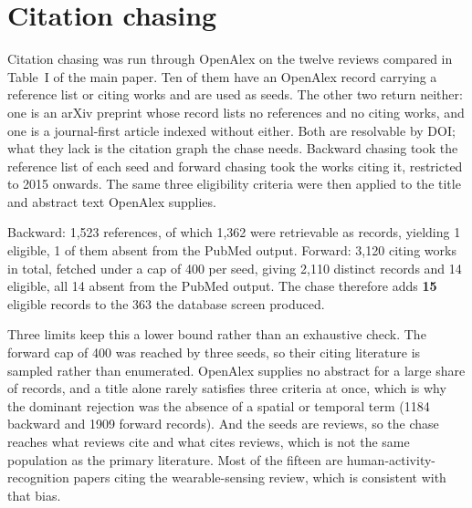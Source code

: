 \documentclass[journal]{IEEEtran}
\begin{document}
\section{Citation chasing}
\label{sec:chasing}
Citation chasing was run through OpenAlex on the twelve reviews compared in Table~I
of the main paper. Ten of them have an OpenAlex record carrying a reference list or
citing works and are used as seeds. The other two return neither: one is an arXiv
preprint whose record lists no references and no citing works, and one is a
journal-first article indexed without either. Both are resolvable by DOI; what they
lack is the citation graph the chase needs. Backward chasing took the reference list of each
seed and forward chasing took the works citing it, restricted to 2015 onwards.
The same three eligibility criteria were then applied to the title and abstract
text OpenAlex supplies.

Backward: 1{,}523 references, of which 1{,}362 were retrievable as records,
yielding 1 eligible, 1 of them absent from the PubMed output. Forward:
3{,}120 citing works in total, fetched under a cap of 400 per seed, giving
2{,}110 distinct records and 14 eligible, all 14 absent from the PubMed
output. The chase therefore adds \textbf{15} eligible records to the 363 the
database screen produced.

Three limits keep this a lower bound rather than an exhaustive check. The
forward cap of 400 was reached by three seeds, so their citing literature is
sampled rather than enumerated. OpenAlex supplies no abstract for a large share
of records, and a title alone rarely satisfies three criteria at once, which is
why the dominant rejection was the absence of a spatial or temporal term
(1184 backward and 1909 forward records). And the seeds are reviews, so the
chase reaches what reviews cite and what cites reviews, which is not the same
population as the primary literature. Most of the fifteen are
human-activity-recognition papers citing the wearable-sensing review, which is
consistent with that bias.
\end{document}
